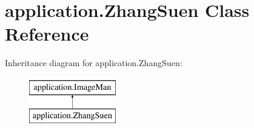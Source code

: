 \hypertarget{classapplication_1_1_zhang_suen}{}\section{application.\+Zhang\+Suen Class Reference}
\label{classapplication_1_1_zhang_suen}
Inheritance diagram for application.\+Zhang\+Suen\+:\begin{figure}[H]
\begin{center}
\leavevmode
\includegraphics[height=2.000000cm]{classapplication_1_1_zhang_suen}
\end{center}
\end{figure}
